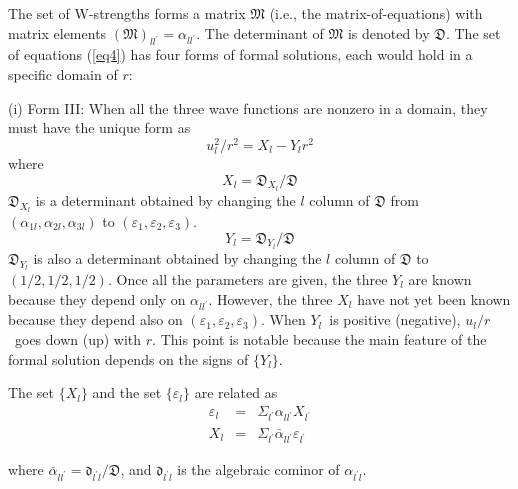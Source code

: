 \documentclass[single-column,showpacs,groupedaddress]{revtex4}
\begin{document}
The set of W-strengths forms a matrix $\mathfrak{M}$ (i.e., the
matrix-of-equations) with matrix elements $(\mathfrak{M})_{ll^{\prime
}}=\alpha _{ll^{\prime }}$. The determinant of $\mathfrak{M}$ is denoted by $%
\mathfrak{D}$. The set of equations (\ref{eq4}) has four forms of formal
solutions, each would hold in a specific domain of $r$:

(i) Form III: When all the three wave functions are nonzero in a domain,
they must have the unique form as
\begin{equation}
u_{l}^{2}/r^{2}=X_{l}-Y_{l}r^{2}  \label{eq5}
\end{equation}%
where
\begin{equation}
X_{l}=\mathfrak{D}_{X_{l}}\mathfrak{/D}  \label{eq6}
\end{equation}%
$\mathfrak{D}_{X_{l}}$ is a determinant obtained by changing the $l$ column
of $\mathfrak{D}$ from $(\alpha _{1l},\alpha _{2l},\alpha _{3l})$ to $%
(\varepsilon _{1},\varepsilon _{2},\varepsilon _{3})$.
\begin{equation}
Y_{l}=\mathfrak{D}_{Y_{l}}\mathfrak{/D}  \label{eq7}
\end{equation}%
$\mathfrak{D}_{Y_{l}}$ is also a determinant obtained by changing the $l$
column of $\mathfrak{D}$ to $(1/2,1/2,1/2)$. Once all the parameters are
given, the three $Y_{l}$ are known because they depend only on $\alpha
_{ll^{\prime }}$. However, the three $X_{l}$ have not yet been known because
they depend also on $(\varepsilon _{1},\varepsilon _{2},\varepsilon _{3})$.
When $Y_{l}$\ is positive (negative), $u_{l}/r$\ goes down (up) with $r$.
This point is notable because the main feature of the formal solution
depends on the signs of $\{Y_{l}\}$.

The set $\{X_{l}\}$ and the set $\{\varepsilon _{l}\}$ are related as
\begin{eqnarray}
\varepsilon _{l} &=&\Sigma _{l^{\prime }}\alpha _{ll^{\prime }}X_{l^{\prime
}}  \label{eq7a} \\
X_{l} &=&\Sigma _{l^{\prime }}\overset{\_}{\alpha }_{ll^{\prime
}}\varepsilon _{l^{\prime }}  \label{eq7b}
\end{eqnarray}

where $\overset{\_}{\alpha }_{ll^{\prime }}=\mathfrak{d}_{l^{\prime }l}/%
\mathfrak{D}$, and $\mathfrak{d}_{l^{\prime }l}$ is the algebraic cominor of
$\alpha _{l^{\prime }l}$.
\end{document}
